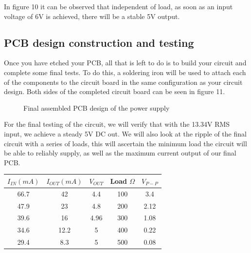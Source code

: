 \documentclass[a4paper,11pt]{article}
\begin{document}
In figure 10 it can be observed that independent of load, as soon as an input voltage of 6V is achieved, there will be a stable 5V output. 


\subsection{PCB design construction and testing}

Once you have etched your PCB, all that is left to do is to build your circuit and complete some final tests. To do this, a soldering iron will be used to attach each of the components to the circuit board in the same configuration as your circuit design. Both sides of the completed circuit board can be seen in figure 11. 

\begin{figure}[h]
 \begin{center}
  \caption{Final assembled PCB design of the power supply}
 \end{center}
\end{figure}

For the final testing of the circuit, we will verify that with the 13.34V RMS input, we achieve a steady 5V DC out. We will also look at the ripple of the final circuit with a series of loads, this will ascertain the minimum load the circuit will be able to reliably supply, as well as the maximum current output of our final PCB. 

\begin{center}
\begin{tabular}{|c|c|c|c|c|}  
\hline
\(\displaystyle I_{IN} (mA) \) & \(\displaystyle I_{OUT} (mA) \)  & \(\displaystyle V_{OUT} \) & Load \(\displaystyle \Omega \) & \(\displaystyle V_{P-P} \)\\
\hline
66.7  & 42   & 4.4  & 100 & 3.4\\
47.9  & 23   & 4.8  & 200 & 2.12\\
39.6  & 16   & 4.96 & 300 & 1.08  \\
34.6  & 12.2 & 5    & 400 & 0.22\\
29.4  & 8.3  & 5    & 500 & 0.08 \\
\hline
\end{tabular}
\end{center}
\end{document}
